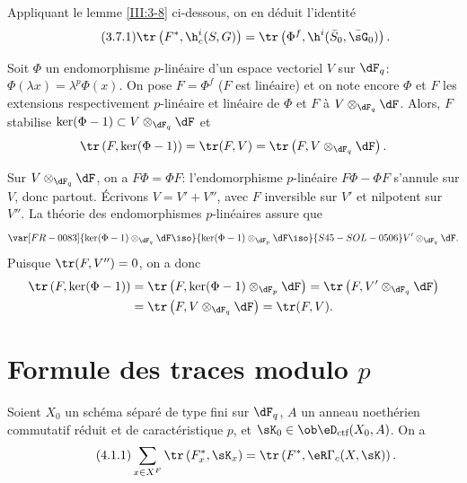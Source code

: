 Appliquant le lemme \ref{III:3-8} ci-dessous, on en déduit l'identité 
\begin{equation*}\tag{3.7.1}\label{III:eq:3-7-1}
  \tr\left(F^*,\h_c^i(S,G)\right) = \tr\left(\Phi^f,\h^i(\bar S_0,\bar\sG_0)\right) \text{.}
\end{equation*}





\begin{lemma_}\label{III:3-8}
Soit $\Phi$ un endomorphisme $p$-linéaire d'un espace vectoriel $V$ sur 
$\dF_q$: $\Phi(\lambda x) = \lambda^p\Phi(x)$. On pose $F=\Phi^f$ ($F$ est 
linéaire) et on note encore $\Phi$ et $F$ les extensions respectivement 
$p$-linéaire et linéaire de $\Phi$ et $F$ à $V\otimes_{\dF_q}\dF$. Alors, $F$ stabilise 
$\ker(\Phi-1)\subset V\otimes_{\dF_q}\dF$ et 
\[
  \tr\left(F,\ker(\Phi-1)\right) = \tr(F,V) = \tr\left(F,V\otimes_{\dF_q}\dF\right) \text{.}
\]
\end{lemma_}

Sur $V\otimes_{\dF_q}\dF$, on a $F\Phi = \Phi F$: l'endomorphisme $p$-linéaire 
$F\Phi-\Phi F$ s'annule sur $V$, donc partout. Écrivons $V=V'+V''$, avec $F$ 
inversible sur $V'$ et nilpotent sur $V''$. La théorie des endomorphismes 
$p$-linéaires assure que 
\[
  \var[FR-0083]{\ker(\Phi-1)\otimes_{\dF_q}\dF \iso}{\ker(\Phi-1)\otimes_{\dF_p}\dF \iso}{S45-SOL-0506} V'\otimes_{\dF_q}\dF \text{.}
\]
Puisque $\tr(F,V'') = 0$, on a donc 
\begin{align*}
  \tr\left(F,\ker(\Phi-1)\right) 
    &= \tr\left(F,\ker(\Phi-1)\otimes_{\dF_p}\dF\right) = \tr\left(F,V'\otimes_{\dF_q}\dF\right) \\
    &= \tr\left(F,V\otimes_{\dF_q}\dF\right) = \tr(F,V) \text{.}
\end{align*}










\section{Formule des traces modulo \texorpdfstring{$p$}{p}}\label{III:4}





\begin{theorem_}\label{III:4-1}
Soient $X_0$ un schéma séparé de type fini sur $\dF_q$, $A$ un anneau 
noethérien commutatif réduit et de caractéristique $p$, et 
$\sK_0\in\ob\eD_\textnormal{ctf}(X_0,A)$. On a 
\begin{equation*}\tag{4.1.1}\label{III:eq:4-1-1}
  \sum_{x\in X^F} \tr\left(F_x^*,\sK_x\right) = \tr\left(F^*,\eR\Gamma_c(X,\sK)\right) \text{.}
\end{equation*}
\end{theorem_}





